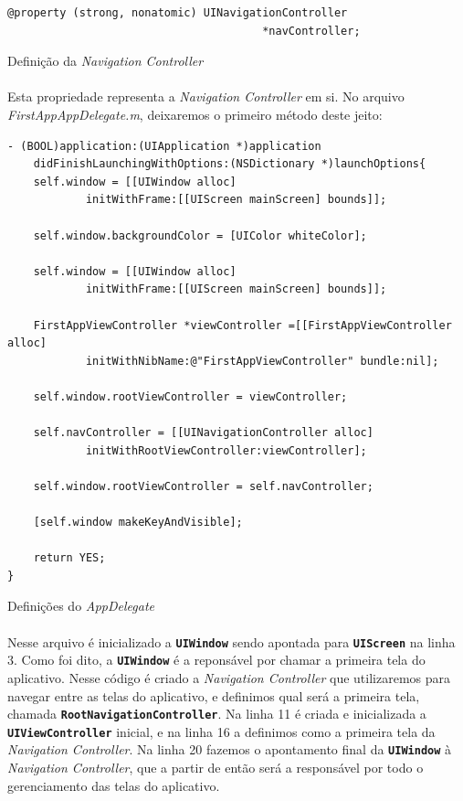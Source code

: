 \documentclass[a4paper,12pt,brazil,doubleside]{book}
\begin{document}
\begin{singlespace}
\begin{listing}
\begin{verbatim}
@property (strong, nonatomic) UINavigationController
									   *navController;
\end{verbatim}
\caption{Definição da \emph{Navigation Controller}}
\end{listing}

\paragraph{}Esta propriedade representa a \emph{Navigation Controller} em si. No arquivo \emph{FirstAppAppDelegate.m}, deixaremos o primeiro método deste jeito:

\begin{listing}[H]
\begin{verbatim}
- (BOOL)application:(UIApplication *)application 
	didFinishLaunchingWithOptions:(NSDictionary *)launchOptions{
    self.window = [[UIWindow alloc] 
    		initWithFrame:[[UIScreen mainScreen] bounds]];

    self.window.backgroundColor = [UIColor whiteColor];
    
    self.window = [[UIWindow alloc] 
    		initWithFrame:[[UIScreen mainScreen] bounds]];
    
    FirstAppViewController *viewController =[[FirstAppViewController alloc] 
    		initWithNibName:@"FirstAppViewController" bundle:nil];
    
    self.window.rootViewController = viewController;

    self.navController = [[UINavigationController alloc] 
    		initWithRootViewController:viewController];
    
    self.window.rootViewController = self.navController;
    
    [self.window makeKeyAndVisible];
    
    return YES;
}
\end{verbatim}
\caption{Definições do \emph{AppDelegate}}
\end{listing}

\paragraph{}Nesse arquivo é inicializado a \texttt{\textbf{UIWindow}} sendo apontada para \texttt{\textbf{UIScreen}} na linha 3. Como foi dito, a \texttt{\textbf{UIWindow}} é a reponsável por chamar a primeira tela do aplicativo. Nesse código é criado a \emph{Navigation Controller} que utilizaremos para navegar entre as telas do aplicativo, e definimos qual será a primeira tela, chamada \texttt{\textbf{RootNavigationController}}. Na linha 11 é criada e inicializada a \texttt{\textbf{UIViewController}} inicial, e na linha 16 a definimos como a primeira tela da \emph{Navigation Controller}. Na linha 20 fazemos o apontamento final da \texttt{\textbf{UIWindow}} à \emph{Navigation Controller}, que a partir de então será a responsável por todo o gerenciamento das telas do aplicativo.

\end{singlespace}
\end{document}
